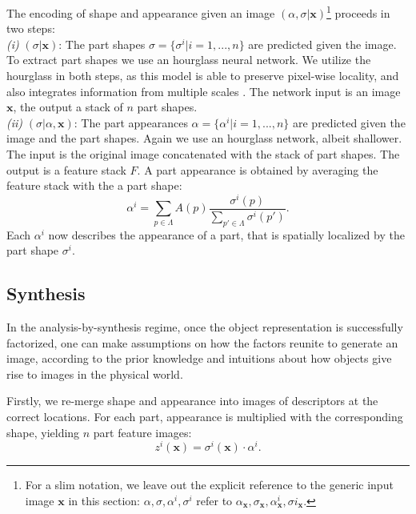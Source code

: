 		The encoding of shape and appearance given an image ${(\alpha, \sigma | \mathbf{x})}$\footnote{ For a slim notation, we leave out the explicit reference to the generic input image $\mathbf{x}$ in this section: $\alpha, \sigma, \alpha^i, {\sigma}^i$ refer to ${\alpha}_\mathbf{x}, {\sigma}_{\mathbf{x}}, \alpha^i_{\mathbf{x}}, {\sigma}i_{\mathbf{x}}$.} proceeds in two steps: \\
		\emph{(i)} $(\sigma |\mathbf{x})$: The part shapes $\sigma =  \{ {\sigma}^i| i=1, ...,  n\}$ are predicted given the image. To extract part shapes we use an hourglass neural network. We utilize the hourglass in both steps, as this model is able to preserve pixel-wise locality, and also integrates information from multiple scales \cite{newell16hourglass}. The network input is an image $\mathbf{x}$, the output a stack of $n$ part shapes.\\
		\emph{(ii)} $(\sigma| \alpha , \mathbf{x})$: The part appearances $\alpha =  \{\alpha^i \vert i=1, ...,  n\}$ are predicted given the image and the part shapes. Again we use an hourglass network, albeit shallower. The input is the original image concatenated with the stack of part shapes. The output is a feature stack $F$. A part appearance is obtained by averaging the feature stack with the a part shape:
		\begin{equation}
			\alpha^i = \sum_{p \in \Lambda} A(p) \frac{{\sigma}^i(p)}{\sum_{p' \in \Lambda}{\sigma}^i(p')}.
		\end{equation}
		Each $\alpha^i$ now describes the appearance of a part, that is spatially localized by the part shape ${\sigma}^i$. \\


	\subsection{Synthesis}
		In the analysis-by-synthesis regime, once the object representation is successfully factorized, one can make assumptions on how the factors reunite to generate an image, according to the prior knowledge and intuitions about how objects give rise to images in the physical world.


		Firstly, we re-merge shape and appearance into images of descriptors at the correct locations. For each part, appearance is multiplied with the corresponding shape, yielding $n$ part feature images:
		\begin{equation}
			z^i(\mathbf{x}) = {\sigma}^i(\mathbf{x}) \cdot \alpha^i .
		\end{equation}



